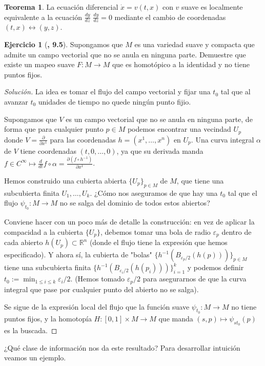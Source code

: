 \documentclass[spanish]{book}
\theoremstyle{definition}
\newtheorem*{teo}{Teorema}
\newtheorem*{ejer*}{Ejercicio}
\newcommand{\R}{\mathbb{R}}
\newcommand{\Cinf}{C^\infty}
\begin{document}
	\begin{teo}
		La ecuación diferencial $\dot{x}=v(t,x)$ con $v$ suave es localmente equivalente a la ecuación $\frac{dy}{dz}$ $\frac{dy}{dz}=0$ mediante el cambio de coordenadas $(t,x)\leftrightarrow(y,z)$.
	\end{teo}
	\begin{ejer*}[\cite{Lee}\textbf{, 9.5}]
		Supongamos que $M$ es una variedad suave y compacta que admite un campo vectorial que no se anula en ninguna parte. Demuestre que existe un mapeo suave $F:M\to M$ que es homotópico a la identidad y no tiene puntos fijos.
	\end{ejer*}
	\begin{proof}[Solución]
		La idea es tomar el flujo del campo vectorial y fijar una $t_0$ tal que al avanzar $t_0$ unidades de tiempo no quede ningún punto fijio.
		
		Supongamos que $V$ es un campo vectorial que no se anula en ninguna parte, de forma que para cualquier punto $p\in M$ podemos encontrar una vecindad $U_p$ donde $V=\frac{\partial}{\partial x^1}$ para las coordenadas $h=(x^1,\ldots,x^n)$ en $U_p$. Una curva integral $\alpha$ de $V$ tiene coordenadas $(t,0,\ldots,0)$, ya que su derivada manda $f\in\Cinf\mapsto\frac{d}{dt}f\circ\alpha=\frac{\partial (f\circ h^{-1})}{\partial x^1}$.
		
		Hemos construido una cubierta abierta $\{U_p\}_{p\in M}$ de $M$, que tiene una subcubierta finita $U_1,\ldots, U_k$. ¿Cómo nos aseguramos de que hay una $t_0$ tal que el flujo $\psi_{t_0}:M\to M$ no se salga del dominio de todos estos abiertos?
		
		Conviene hacer con un poco más de detalle la construcción: en vez de aplicar la compacidad a la cubierta $\{U_p\}$, debemos tomar una bola de radio $\varepsilon_p$ dentro de cada abierto $h(U_p)\subset\R^n$ (donde el flujo tiene la expresión que hemos especificado). Y ahora sí, la cubierta de "bolas" $\{h^{-1}(B_{\varepsilon_p/2}(h(p)))\}_{p\in M}$ tiene una subcubierta finita $\{h^{-1}(B_{\varepsilon_i/2}(h(p_i)))\}_{i=1}^k$ y podemos definir $t_0:=\min_{1\leq i\leq k}\varepsilon_i/2$. (Hemos tomado $\varepsilon_p/2$ para asegurarnos de que la curva integral que pase por cualquier punto del abierto no se salga).
		
		Se sigue de la expresión local del flujo que la función suave $\psi_{t_0}:M\to M$ no tiene puntos fijos, y la homotopía $H:[0,1]\times M\to M$ que manda $(s,p)\mapsto \psi_{st_0}(p)$ es la buscada.
	\end{proof}
	¿Qué clase de información nos da este resultado? Para desarrollar intuición veamos un ejemplo.
\end{document}
